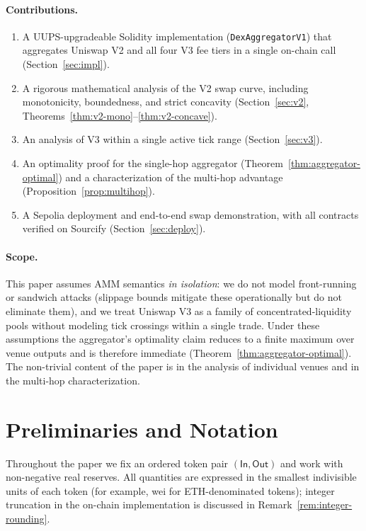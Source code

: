 \documentclass[11pt,a4paper]{article}
\theoremstyle{definition}
\begin{document}
\paragraph{Contributions.}
\begin{enumerate}[leftmargin=*]
    \item A UUPS-upgradeable Solidity implementation (\texttt{DexAggregatorV1}) that
          aggregates Uniswap V2 and all four V3 fee tiers in a single on-chain
          call (Section~\ref{sec:impl}).
    \item A rigorous mathematical analysis of the V2 swap curve, including
          monotonicity, boundedness, and strict concavity
          (Section~\ref{sec:v2}, Theorems~\ref{thm:v2-mono}--\ref{thm:v2-concave}).
    \item An analysis of V3 within a single active tick range
          (Section~\ref{sec:v3}).
    \item An optimality proof for the single-hop aggregator
          (Theorem~\ref{thm:aggregator-optimal}) and a characterization of the
          multi-hop advantage (Proposition~\ref{prop:multihop}).
    \item A Sepolia deployment and end-to-end swap demonstration, with all
          contracts verified on Sourcify (Section~\ref{sec:deploy}).
\end{enumerate}

\paragraph{Scope.}
This paper assumes AMM semantics \emph{in isolation}: we do not model front-running
or sandwich attacks (slippage bounds mitigate these operationally but do not
eliminate them), and we treat Uniswap V3 as a family of concentrated-liquidity
pools without modeling tick crossings within a single trade. Under these
assumptions the aggregator's optimality claim reduces to a finite maximum over
venue outputs and is therefore immediate (Theorem~\ref{thm:aggregator-optimal}).
The non-trivial content of the paper is in the analysis of individual venues and
in the multi-hop characterization.

\section{Preliminaries and Notation}
\label{sec:prelim}

Throughout the paper we fix an ordered token pair $(\mathsf{In}, \mathsf{Out})$
and work with non-negative real reserves. All quantities are expressed in the
smallest indivisible units of each token (for example, wei for ETH-denominated
tokens); integer truncation in the on-chain implementation is discussed in
Remark~\ref{rem:integer-rounding}.
\end{document}
